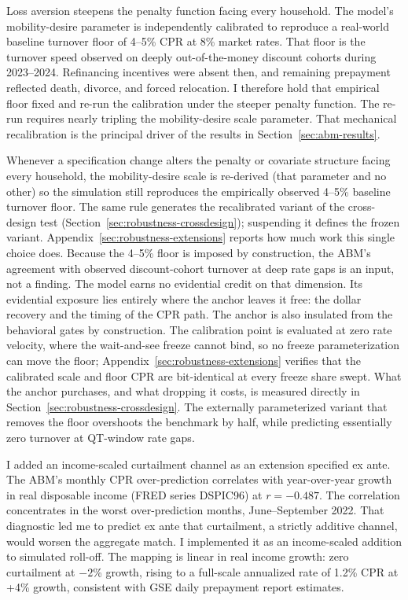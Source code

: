 \documentclass[12pt]{article}
\begin{document}
Loss aversion steepens the penalty function facing every household. The model's mobility-desire parameter is independently calibrated to reproduce a real-world baseline turnover floor of 4--5\% CPR at 8\% market rates. That floor is the turnover speed observed on deeply out-of-the-money discount cohorts during 2023--2024. Refinancing incentives were absent then, and remaining prepayment reflected death, divorce, and forced relocation. I therefore hold that empirical floor fixed and re-run the calibration under the steeper penalty function. The re-run requires nearly tripling the mobility-desire scale parameter. That mechanical recalibration is the principal driver of the results in Section~\ref{sec:abm-results}.

Whenever a specification change alters the penalty or covariate structure facing every household, the mobility-desire scale is re-derived (that parameter and no other) so the simulation still reproduces the empirically observed 4--5\% baseline turnover floor. The same rule generates the recalibrated variant of the cross-design test (Section~\ref{sec:robustness-crossdesign}); suspending it defines the frozen variant. Appendix~\ref{sec:robustness-extensions} reports how much work this single choice does. Because the 4--5\% floor is imposed by construction, the ABM's agreement with observed discount-cohort turnover at deep rate gaps is an input, not a finding. The model earns no evidential credit on that dimension. Its evidential exposure lies entirely where the anchor leaves it free: the dollar recovery and the timing of the CPR path. The anchor is also insulated from the behavioral gates by construction. The calibration point is evaluated at zero rate velocity, where the wait-and-see freeze cannot bind, so no freeze parameterization can move the floor; Appendix~\ref{sec:robustness-extensions} verifies that the calibrated scale and floor CPR are bit-identical at every freeze share swept. What the anchor purchases, and what dropping it costs, is measured directly in Section~\ref{sec:robustness-crossdesign}. The externally parameterized variant that removes the floor overshoots the benchmark by half, while predicting essentially zero turnover at QT-window rate gaps.

I added an income-scaled curtailment channel as an extension specified ex ante. The ABM's monthly CPR over-prediction correlates with year-over-year growth in real disposable income (FRED series DSPIC96) at $r = -0.487$. The correlation concentrates in the worst over-prediction months, June--September 2022. That diagnostic led me to predict ex ante that curtailment, a strictly additive channel, would worsen the aggregate match. I implemented it as an income-scaled addition to simulated roll-off. The mapping is linear in real income growth: zero curtailment at $-2$\% growth, rising to a full-scale annualized rate of 1.2\% CPR at +4\% growth, consistent with GSE daily prepayment report estimates.
\end{document}
